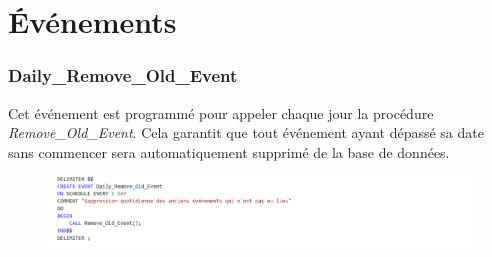\documentclass[a4paper,12pt]{report}   %
\begin{document}
\section*{Événements}
\subsubsection*{Daily\_Remove\_Old\_Event}
Cet événement est programmé pour appeler chaque jour la procédure \textit{Remove\_Old\_Event}. Cela garantit que tout événement ayant dépassé sa date sans commencer sera automatiquement supprimé de la base de données.
\begin{center}
	\begin{figure}[!h]
          \includegraphics[width=24cm]{event}  
    \end{figure}
\end{center}
\end{document}
